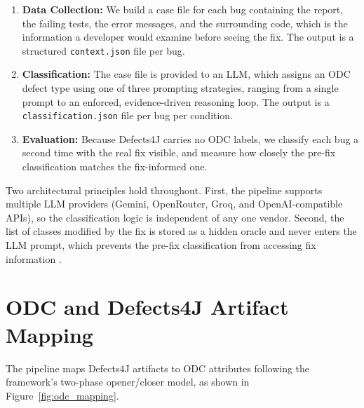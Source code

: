 \documentclass{iutbscthesis}
\begin{document}
\begin{enumerate}
    \item \textbf{Data Collection:} We build a case file for each bug containing the report, the failing tests, the error messages, and the surrounding code, which is the information a developer would examine before seeing the fix. The output is a structured \texttt{context.json} file per bug.
    \item \textbf{Classification:} The case file is provided to an LLM, which assigns an ODC defect type using one of three prompting strategies, ranging from a single prompt to an enforced, evidence-driven reasoning loop. The output is a \texttt{classification.json} file per bug per condition.
    \item \textbf{Evaluation:} Because Defects4J carries no ODC labels, we classify each bug a second time with the real fix visible, and measure how closely the pre-fix classification matches the fix-informed one.
\end{enumerate}

Two architectural principles hold throughout. First, the pipeline supports multiple LLM providers (Gemini, OpenRouter, Groq, and OpenAI-compatible APIs), so the classification logic is independent of any one vendor. Second, the list of classes modified by the fix is stored as a hidden oracle and never enters the LLM prompt, which prevents the pre-fix classification from accessing fix information \cite{rafi2024revisiting}.

\section{ODC and Defects4J Artifact Mapping}

The pipeline maps Defects4J artifacts to ODC attributes following the framework's two-phase opener/closer model, as shown in Figure~\ref{fig:odc_mapping}.
\end{document}
